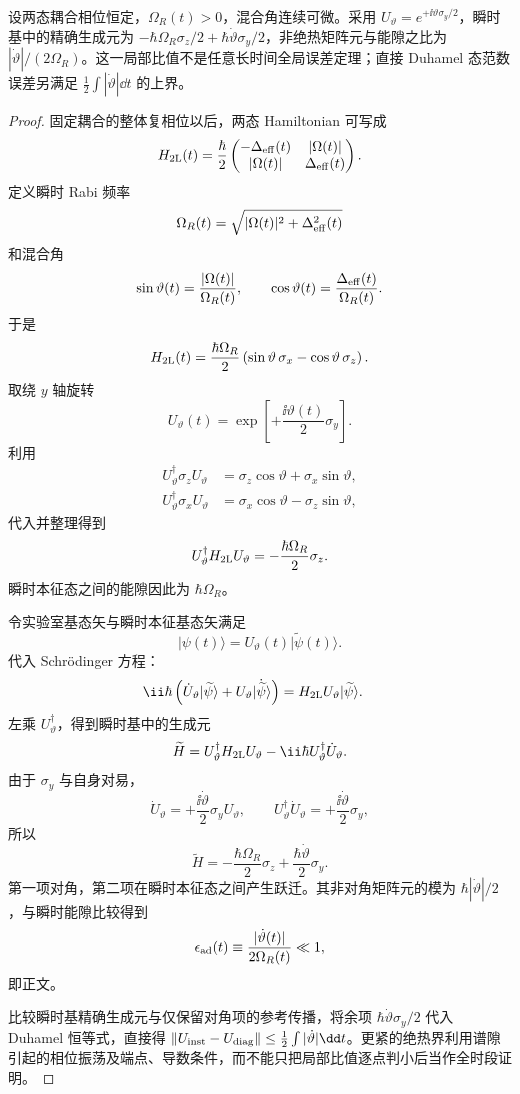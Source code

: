 \begin{proposition}[二态瞬时本征基的连接项]
设两态耦合相位恒定，$\Omega_R(t)>0$，混合角连续可微。采用 $U_\vartheta=e^{+\ii\vartheta\sigma_y/2}$，瞬时基中的精确生成元为 $-\hbar\Omega_R\sigma_z/2+\hbar\dot\vartheta\sigma_y/2$，非绝热矩阵元与能隙之比为 $|\dot\vartheta|/(2\Omega_R)$。这一局部比值不是任意长时间全局误差定理；直接 Duhamel 态范数误差另满足 $\frac12\int|\dot\vartheta|\dd t$ 的上界。
\end{proposition}
\begin{proof}
固定耦合的整体复相位以后，两态 Hamiltonian 可写成
\[
H_{2\rm L}(t)
=\frac{\hbar}{2}
\begin{pmatrix}
-\Delta_{\rm eff}(t)&|\Omega(t)|\\
|\Omega(t)|&\Delta_{\rm eff}(t)
\end{pmatrix}.
\]
定义瞬时 Rabi 频率
\[
\Omega_R(t)=\sqrt{|\Omega(t)|^2+\Delta_{\rm eff}^2(t)}
\]
和混合角
\[
\sin\vartheta(t)=\frac{|\Omega(t)|}{\Omega_R(t)},
\qquad
\cos\vartheta(t)=\frac{\Delta_{\rm eff}(t)}{\Omega_R(t)}.
\]
于是
\[
H_{2\rm L}(t)
=\frac{\hbar\Omega_R}{2}
\left(\sin\vartheta\,\sigma_x-\cos\vartheta\,\sigma_z\right).
\]
取绕 $y$ 轴旋转
\[
U_\vartheta(t)=\exp\!\left[+\frac{\ii\vartheta(t)}2\sigma_y\right].
\]
利用
\begin{align*}
U_\vartheta^\dagger\sigma_zU_\vartheta
&=\sigma_z\cos\vartheta+\sigma_x\sin\vartheta,\\
U_\vartheta^\dagger\sigma_xU_\vartheta
&=\sigma_x\cos\vartheta-\sigma_z\sin\vartheta,
\end{align*}
代入并整理得到
\[
U_\vartheta^\dagger H_{2\rm L}U_\vartheta
=-\frac{\hbar\Omega_R}{2}\sigma_z.
\]
瞬时本征态之间的能隙因此为 $\hbar\Omega_R$。

令实验室基态矢与瞬时本征基态矢满足
\[
|\psi(t)\rangle=U_\vartheta(t)|\widetilde\psi(t)\rangle.
\]
代入 Schr\"odinger 方程：
\begin{align*}
\ii\hbar\left(\dot U_\vartheta|\widetilde\psi\rangle
+U_\vartheta|\dot{\widetilde\psi}\rangle\right)
&=H_{2\rm L}U_\vartheta|\widetilde\psi\rangle.
\end{align*}
左乘 $U_\vartheta^\dagger$，得到瞬时基中的生成元
\[
\widetilde H
=U_\vartheta^\dagger H_{2\rm L}U_\vartheta
-\ii\hbar U_\vartheta^\dagger\dot U_\vartheta.
\]
由于 $\sigma_y$ 与自身对易，
\[
\dot U_\vartheta
=+\frac{\ii\dot\vartheta}{2}\sigma_yU_\vartheta,
\qquad
U_\vartheta^\dagger\dot U_\vartheta
=+\frac{\ii\dot\vartheta}{2}\sigma_y,
\]
所以
\[
\widetilde H
=-\frac{\hbar\Omega_R}{2}\sigma_z
+\frac{\hbar\dot\vartheta}{2}\sigma_y.
\]
第一项对角，第二项在瞬时本征态之间产生跃迁。其非对角矩阵元的模为
$\hbar|\dot\vartheta|/2$，与瞬时能隙比较得到
\[
\epsilon_{\rm ad}(t)
\equiv\frac{|\dot\vartheta(t)|}{2\Omega_R(t)}\ll1,
\]
即正文。

比较瞬时基精确生成元与仅保留对角项的参考传播，将余项 $\hbar\dot\vartheta\sigma_y/2$ 代入 Duhamel 恒等式，直接得 $\|U_{\rm inst}-U_{\rm diag}\|\le\frac12\int|\dot\vartheta|\dd t$。更紧的绝热界利用谱隙引起的相位振荡及端点、导数条件，而不能只把局部比值逐点判小后当作全时段证明。
\end{proof}


